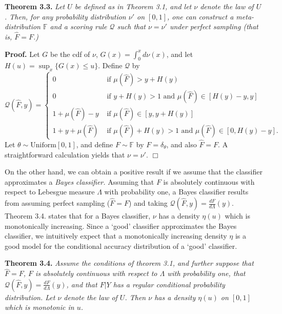 \documentclass{article}
\begin{document}
\noindent\textbf{Theorem 3.3.} \emph{ Let $U$ be defined as in Theorem
  3.1, and let $\nu$ denote the law of $U$.  Then, for any probability
  distribution $\nu'$ on $[0,1]$, one can construct a
  meta-distribution $\mathbb{F}$ and a scoring rule $\mathcal{Q}$ such
  that $\nu = \nu'$ under perfect sampling (that is, $\hat{F} = F$.)  }

\textbf{Proof.}  
Let $G$ be the cdf of $\nu$, $G(x) = \int_0^x d\nu(x)$, and let $H(u) = \sup_x \{G(x) \leq u\}$.
Define $\mathcal{Q}$ by
\[
\mathcal{Q}(\hat{F}, y) = \begin{cases}
0 &\text{ if }\mu(\hat{F}) > y + H(y)\\
0 & \text{ if }y + H(y) > 1 \text{ and }\mu(\hat{F}) \in [H(y) - y, y]\\
1 + \mu(\hat{F}) - y &\text{ if } \mu(\hat{F}) \in [y, y + H(y)]\\
1 + y + \mu(\hat{F}) &\text{ if }\mu(\hat{F}) + H(y) > 1 \text{ and }\mu(\hat{F}) \in [0, H(y) - y]. 
\end{cases}
\]
Let $\theta \sim \text{Uniform}[0,1]$,
and define $F \sim \mathbb{F}$ by $F = \delta_\theta$, and also $\hat{F} = F.$
A straightforward calculation yields that $\nu = \nu'$. $\Box$

On the other hand, we can obtain a positive result if we assume that
the classifier approximates a \emph{Bayes classifier.}
Assuming that $F$ is absolutely continuous with respect to Lebesgue measure $\Lambda$ with probability one,
a Bayes classifier results from assuming perfect sampling ($\hat{F} = F$) and taking
$\mathcal{Q}(\hat{F}, y) = \frac{dF}{d\Lambda}(y)$.
Theorem 3.4. states that for a Bayes classifier, $\nu$ has a density $\eta(u)$ which is monotonically increasing.
Since a `good' classifier approximates the Bayes classifier, we intuitively expect that a monotonically
increasing density $\eta$ is a good model for the conditional accuracy distribution of a `good' classifier.

\noindent\textbf{Theorem 3.4.} \emph{ Assume the conditions of theorem 3.1, and further suppose
that $\hat{F} = F$, $F$ is absolutely continuous with respect to $\Lambda$ with probability one,
that $\mathcal{Q}(\hat{F}, y) = \frac{dF}{d\Lambda}(y)$, and that $F|Y$ has a regular conditional probability distribution.
Let $\nu$ denote the law of $U$.    Then $\nu$ has a density $\eta(u)$ on $[0, 1]$ which is monotonic in $u$.
}
\end{document}
